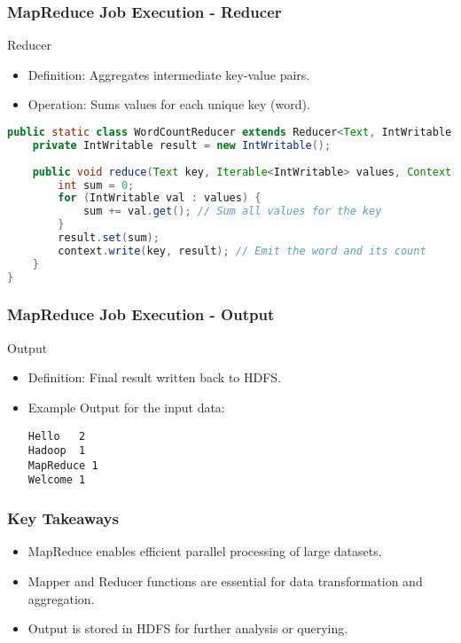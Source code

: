 \documentclass[aspectratio=169]{beamer}
\begin{document}
\begin{frame}[fragile]
    \frametitle{MapReduce Job Execution - Reducer}
    \begin{block}{Reducer}
        \begin{itemize}
            \item Definition: Aggregates intermediate key-value pairs.
            \item Operation: Sums values for each unique key (word).
        \end{itemize}
        \begin{lstlisting}[language=Java]
public static class WordCountReducer extends Reducer<Text, IntWritable, Text, IntWritable> {
    private IntWritable result = new IntWritable();
    
    public void reduce(Text key, Iterable<IntWritable> values, Context context) throws IOException, InterruptedException {
        int sum = 0;
        for (IntWritable val : values) {
            sum += val.get(); // Sum all values for the key
        }
        result.set(sum);
        context.write(key, result); // Emit the word and its count
    }
}
        \end{lstlisting}
    \end{block}
\end{frame}

\begin{frame}[fragile]
    \frametitle{MapReduce Job Execution - Output}
    \begin{block}{Output}
        \begin{itemize}
            \item Definition: Final result written back to HDFS.
            \item Example Output for the input data:
            \begin{verbatim}
Hello   2
Hadoop  1
MapReduce 1
Welcome 1
            \end{verbatim}
        \end{itemize}
    \end{block}
\end{frame}

\begin{frame}[fragile]
    \frametitle{Key Takeaways}
    \begin{itemize}
        \item MapReduce enables efficient parallel processing of large datasets.
        \item Mapper and Reducer functions are essential for data transformation and aggregation.
        \item Output is stored in HDFS for further analysis or querying.
    \end{itemize}
\end{frame}
\end{document}
